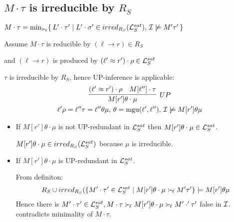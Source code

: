 \documentclass[%
handout,
]{beamer}
\begin{document}
\subsection{$M\cdot\tau$ is irreducible by $R_S$}
\begin{frame}[allowframebreaks]

    \textcolor{gray}{$
    M\cdot\tau = \min_{\mathrel\succ_{\!\ell}}\!
    \left\{\,
        L'\cdot\tau' \mid
        L'\cdot\sigma' \in irred_{R_S}(\mathcal{L}_S^{sat}),\,
        \mathcal{I} \not\models M'\tau'\,
    \right\}
    $}

        Assume $M\cdot\tau$ is reducible by $(\ell\to r)\in R_S$

        and $(\ell\to r)$ is produced by $(\ell'\approx r')\cdot\rho\in\mathcal{L}_S^{sat}$

        $\tau$ is irreducible by $R_S$,
        hence UP-inference is applicable:
        \begin{gather*}
            \infer[UP]
            {M[r']\theta\cdot\mu}
            {(\ell'\mEQ r')\cdot\rho & M[\ell'']\cdot\tau}
            \\
            \ell'\rho = \ell''\tau = \ell''\theta\mu,\,
            \theta=\mgu(\ell',\ell''),\,
            \mcI\not\models M[r']\theta\mu
        \end{gather*}
        \pagebreak

        \begin{itemize}
            \item If $M[r']\theta\cdot\mu$ is not UP-redundant in $\mathcal{L}_S^{sat}$
            then $M[r']\theta\cdot\mu\in\mathcal{L}_S^{sat}$.

            $M[r']\theta\cdot\mu\in irred_{R_S}(\mathcal{L}_S^{sat})$ because $\mu$ is irreducible.


            \item If $M[r']\theta\cdot\mu$ is UP-redundant in $\mathcal{L}_S^{sat}$.

             From definiton:
            \begin{gather*}
                R_S \cup irred_{R_S}(
                \{
                    M'\cdot\tau'\in\mathcal{L}_S^{sat}\mid
                    M[r']\theta\cdot\mu \mathrel\succ_{\!\ell} M'\tau'
                    \} \models M[r']\theta\mu
            \end{gather*}
            Hence there is $M'\cdot\tau'\in\mathcal{L}_S^{sat},
            M\cdot\tau\mathrel\succ_{\!\ell} M[r']\theta\cdot\mu\mathrel\succ_{\!\ell} M'\cdot'\tau'$
            false in $\mathcal{I}$.
            contradicts minimality of $M\cdot\tau$.

        \end{itemize}
\end{frame}
\end{document}
